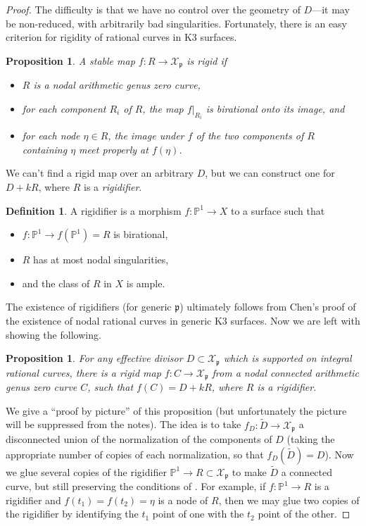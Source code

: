 \documentclass{amsart}
\renewcommand{\prime}{\mathfrak{p}}
\newcommand{\from}{\colon}
\theoremstyle{plain}
\newtheorem{proposition}[theorem]{Proposition}
\theoremstyle{definition}
\newtheorem{definition}[theorem]{Definition}
\theoremstyle{remark}
\begin{document}
\begin{proof}
The difficulty is that we have no control over the geometry of $D$---it may be non-reduced, with arbitrarily bad singularities. Fortunately, there is an easy criterion for rigidity of rational curves in K3 surfaces.
\begin{proposition}
\label{proposition:rigid-conditions}
A stable map $f:R \to \mathcal{X}_{\prime}$ is rigid if
\begin{itemize}
	\item $R$ is a nodal arithmetic genus zero curve,
	\item for each component $R_i$ of $R$, the map $f|_{R_i}$ is birational onto its image, and
	\item for each node $\eta \in R$, the image under $f$ of the 
	two components of $R$ containing $\eta$ meet properly at $f(\eta)$.
\end{itemize}
\end{proposition}
We can't find a rigid map over an arbitrary $D$, but we can construct one for $D+kR$, where $R$ is a 
\emph{rigidifier}.
\begin{definition}
A rigidifier is a morphism $f\from \mathbb{P}^1 \to X$ to a surface such that
\begin{itemize}
	\item $f\from \mathbb{P}^1 \to f(\mathbb{P}^1)=R$ is birational,
	\item $R$ has at most nodal singularities,
	\item and the class of $R$ in $X$ is ample.
 \end{itemize}
\end{definition}
The existence of rigidifiers (for generic $\prime$) ultimately follows from Chen's proof of the existence of nodal
rational curves in generic K3 surfaces. Now we are left with showing the following.
\begin{proposition}
For any effective divisor $D \subset \mathcal{X}_\prime$ which is supported on integral rational curves, 
there is a rigid map $f:C \to \mathcal{X}_\prime$ from a nodal connected arithmetic genus zero curve $C$,
such that $f(C)=D+kR$, where $R$ is a rigidifier.
\end{proposition}
We give a ``proof by picture'' of this proposition (but unfortunately the picture will be suppressed from the notes). The idea is to take $f_D:\tilde{D} \to \mathcal{X}_\prime$ a disconnected union of the normalization 
of the components of $D$ (taking the appropriate number of copies of each normalization, so that $f_D(\tilde{D})=D$). Now we glue several copies of the rigidifier $\mathbb{P}^1 \to R \subset \mathcal{X}_\prime$ to
make $\tilde{D}$ a connected curve, but still preserving the conditions of .
For example, if $f:\mathbb{P}^1 \to R$ is a rigidifier and $f(t_1)=f(t_2)=\eta$ is a node of $R$,
then we may glue two copies of the rigidifier by identifying the $t_1$ point of one with the $t_2$ point of the other. 
\end{proof}
\end{document}
